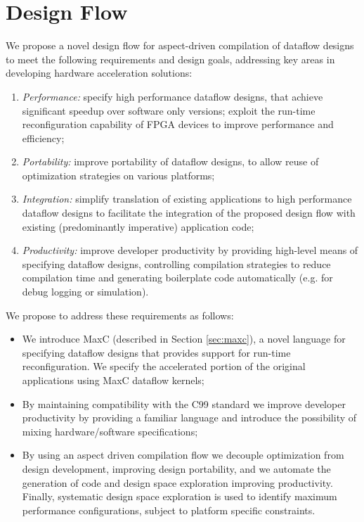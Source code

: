 \section{Design Flow}
\label{sec:design-flow}

We propose a novel design flow for aspect-driven compilation of
dataflow designs to meet the following requirements and design goals,
addressing key areas in developing hardware acceleration solutions:
\begin{enumerate}
\item \emph{Performance:} specify high performance dataflow designs, that
  achieve significant speedup over software only versions; exploit the
  run-time reconfiguration capability of FPGA devices to improve
  performance and efficiency;
\item \emph{Portability:} improve portability of dataflow designs, to
  allow reuse of optimization strategies on various platforms;
\item \emph{Integration:} simplify translation of existing
  applications to high performance dataflow designs to facilitate the
  integration of the proposed design flow with existing (predominantly
  imperative) application code;
\item \emph{Productivity:} improve developer productivity by providing
  high-level means of specifying dataflow designs, controlling
  compilation strategies to reduce compilation time and generating
  boilerplate code automatically (e.g. for debug logging or
  simulation).
\end{enumerate}

We propose to address these requirements as follows:
\begin{itemize}
\item We introduce MaxC (described in Section \ref{sec:maxc}), a novel
  language for specifying dataflow designs that provides support for
  run-time reconfiguration. We specify the accelerated portion of the
  original applications using MaxC dataflow kernels;
\item By maintaining compatibility with the C99 standard we improve
  developer productivity by providing a familiar language and
  introduce the possibility of mixing hardware/software
  specifications;
\item By using an aspect driven compilation flow we decouple
  optimization from design development, improving design portability,
  and we automate the generation of code and design space exploration
  improving productivity. Finally, systematic design space exploration
  is used to identify maximum performance configurations, subject to
  platform specific constraints.
\end{itemize}



